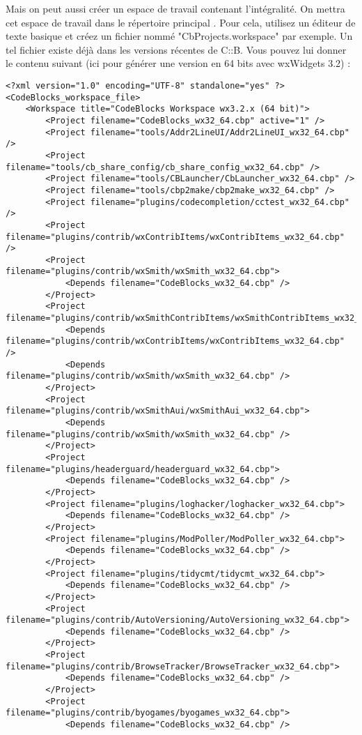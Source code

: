Mais on peut aussi créer un espace de travail contenant l'intégralité. On mettra cet espace de travail dans le répertoire principal . Pour cela, utilisez un éditeur de texte basique et créez un fichier nommé "CbProjects.workspace" par exemple. Un tel fichier existe déjà dans les versions récentes de C::B. Vous pouvez lui donner le contenu suivant (ici pour générer une version en 64 bits avec wxWidgets 3.2) : 

{\footnotesize
\begin{verbatim}
<?xml version="1.0" encoding="UTF-8" standalone="yes" ?>
<CodeBlocks_workspace_file>
	<Workspace title="CodeBlocks Workspace wx3.2.x (64 bit)">
		<Project filename="CodeBlocks_wx32_64.cbp" active="1" />
		<Project filename="tools/Addr2LineUI/Addr2LineUI_wx32_64.cbp" />
		<Project filename="tools/cb_share_config/cb_share_config_wx32_64.cbp" />
		<Project filename="tools/CBLauncher/CbLauncher_wx32_64.cbp" />
		<Project filename="tools/cbp2make/cbp2make_wx32_64.cbp" />
		<Project filename="plugins/codecompletion/cctest_wx32_64.cbp" />
		<Project filename="plugins/contrib/wxContribItems/wxContribItems_wx32_64.cbp" />
		<Project filename="plugins/contrib/wxSmith/wxSmith_wx32_64.cbp">
			<Depends filename="CodeBlocks_wx32_64.cbp" />
		</Project>
		<Project filename="plugins/contrib/wxSmithContribItems/wxSmithContribItems_wx32_64.cbp">
			<Depends filename="plugins/contrib/wxContribItems/wxContribItems_wx32_64.cbp" />
			<Depends filename="plugins/contrib/wxSmith/wxSmith_wx32_64.cbp" />
		</Project>
		<Project filename="plugins/contrib/wxSmithAui/wxSmithAui_wx32_64.cbp">
			<Depends filename="plugins/contrib/wxSmith/wxSmith_wx32_64.cbp" />
		</Project>
		<Project filename="plugins/headerguard/headerguard_wx32_64.cbp">
			<Depends filename="CodeBlocks_wx32_64.cbp" />
		</Project>
		<Project filename="plugins/loghacker/loghacker_wx32_64.cbp">
			<Depends filename="CodeBlocks_wx32_64.cbp" />
		</Project>
		<Project filename="plugins/ModPoller/ModPoller_wx32_64.cbp">
			<Depends filename="CodeBlocks_wx32_64.cbp" />
		</Project>
		<Project filename="plugins/tidycmt/tidycmt_wx32_64.cbp">
			<Depends filename="CodeBlocks_wx32_64.cbp" />
		</Project>
		<Project filename="plugins/contrib/AutoVersioning/AutoVersioning_wx32_64.cbp">
			<Depends filename="CodeBlocks_wx32_64.cbp" />
		</Project>
		<Project filename="plugins/contrib/BrowseTracker/BrowseTracker_wx32_64.cbp">
			<Depends filename="CodeBlocks_wx32_64.cbp" />
		</Project>
		<Project filename="plugins/contrib/byogames/byogames_wx32_64.cbp">
			<Depends filename="CodeBlocks_wx32_64.cbp" />

\end{verbatim}}
